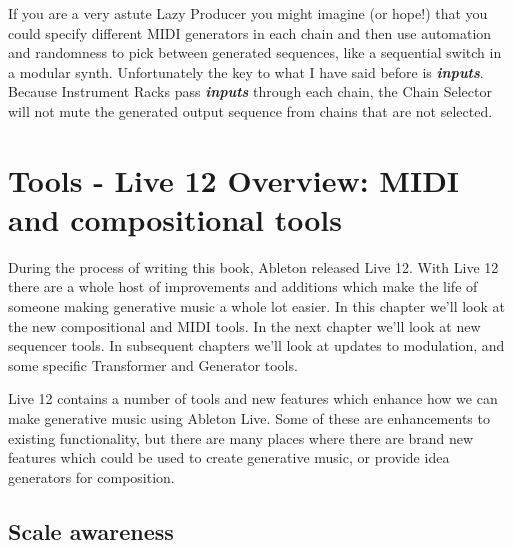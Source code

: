 \documentclass[
  12pt,
  letterpaper,
  oneside,
  open=any]{scrbook}
\begin{document}
If you are a very astute Lazy Producer you might imagine (or hope!) that
you could specify different MIDI generators in each chain and then use
automation and randomness to pick between generated sequences, like a
sequential switch in a modular synth. Unfortunately the key to what I
have said before is \textbf{\emph{inputs}}. Because Instrument Racks
pass \textbf{\emph{inputs}} through each chain, the Chain Selector will
not mute the generated output sequence from chains that are not
selected.


\chapter{Tools - Live 12 Overview: MIDI and compositional
tools}\label{Chapter-030-Tools-Live12_Intro}

During the process of writing this book, Ableton released Live 12. With
Live 12 there are a whole host of improvements and additions which make
the life of someone making generative music a whole lot easier. In this
chapter we'll look at the new compositional and MIDI tools. In the next
chapter we'll look at new sequencer tools. In subsequent chapters we'll
look at updates to modulation, and some specific Transformer and
Generator tools.

\begin{tcolorbox}[enhanced jigsaw, colback=white, rightrule=.15mm, toprule=.15mm, arc=.35mm, opacitybacktitle=0.6, coltitle=black, leftrule=.75mm, bottomtitle=1mm, toptitle=1mm, left=2mm, bottomrule=.15mm, titlerule=0mm, colbacktitle=quarto-callout-tip-color!10!white, colframe=quarto-callout-tip-color-frame, title=\textcolor{quarto-callout-tip-color}{\faLightbulb}\hspace{0.5em}{Key idea}, breakable, opacityback=0]

Live 12 contains a number of tools and new features which enhance how we
can make generative music using Ableton Live. Some of these are
enhancements to existing functionality, but there are many places where
there are brand new features which could be used to create generative
music, or provide idea generators for composition.

\end{tcolorbox}

\section{Scale awareness}\label{scale-awareness}
\end{document}
